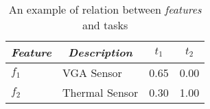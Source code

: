 \begin{table}[ht]
	\centering
	\caption{An example of relation between \textit{features} and tasks}
	\label{table_example01}
\begin{tabular}{|l|l|l|l|}
\hline
\multicolumn{1}{|c|}{\textit{Feature}} & \multicolumn{1}{c|}{\textit{Description}} & \multicolumn{1}{c|}{$t_1$} & \multicolumn{1}{c|}{$t_2$} \\ \hline
$f_1$                                  & VGA Sensor                                & 0.65                       & 0.00                       \\ \hline
$f_2$                                  & Thermal Sensor                            & 0.30                       & 1.00                      \\ \hline
\end{tabular}
\end{table}
